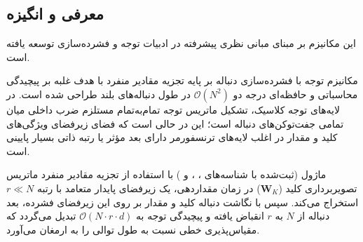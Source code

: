 \subsection{معرفی و انگیزه}
این مکانیزم بر مبنای مبانی نظری پیشرفته در ادبیات توجه و فشرده‌سازی \cite{eckart1936approximation} توسعه یافته است.

مکانیزم توجه با فشرده‌سازی دنباله بر پایه تجزیه مقادیر منفرد  با هدف غلبه بر پیچیدگی محاسباتی و حافظه‌ای درجه دو $\mathcal{O}(N^2)$ در طول دنباله‌های بلند طراحی شده است. در لایه‌های توجه کلاسیک، تشکیل ماتریس توجه تمام‌به‌تمام مستلزم ضرب داخلی میان تمامی جفت‌توکن‌های دنباله است؛ این در حالی است که فضای زیرفضای ویژگی‌های کلید و مقدار در اغلب لایه‌های ترنسفورمر دارای بعد مؤثر یا رتبه ذاتی بسیار پایینی است.

ماژول  (ثبت‌شده با شناسه‌های ، ،  و ) با استفاده از تجزیه مقادیر منفرد ماتریس تصویربرداری کلید ($\mathbf{W}_K$) در زمان مقداردهی، یک زیرفضای پایدار متعامد با رتبه $r \ll N$ استخراج می‌کند. سپس با نگاشت دنباله کلید و مقدار بر روی این زیرفضای فشرده، بعد دنباله از $N$ به $r$ انقباض یافته و پیچیدگی توجه به $\mathcal{O}(N \cdot r \cdot d)$ تبدیل می‌گردد که مقیاس‌پذیری خطی نسبت به طول توالی را به ارمغان می‌آورد.
